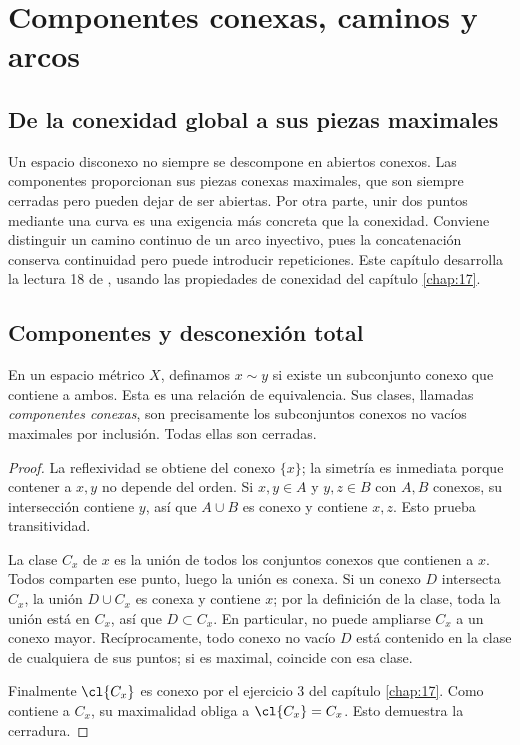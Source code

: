 \chapter{Componentes conexas, caminos y arcos}\label{chap:18}

\section{De la conexidad global a sus piezas maximales}
Un espacio disconexo no siempre se descompone en abiertos conexos. Las componentes proporcionan sus piezas conexas maximales, que son siempre cerradas pero pueden dejar de ser abiertas. Por otra parte, unir dos puntos mediante una curva es una exigencia más concreta que la conexidad. Conviene distinguir un camino continuo de un arco inyectivo, pues la concatenación conserva continuidad pero puede introducir repeticiones. Este capítulo desarrolla la lectura 18 de \cite{valencia}, usando las propiedades de conexidad del capítulo \ref{chap:17}.

\section{Componentes y desconexión total}
\begin{proposicion}\label{ch18:componentes}
En un espacio métrico $X$, definamos $x\sim y$ si existe un subconjunto conexo que contiene a ambos. Esta es una relación de equivalencia. Sus clases, llamadas \emph{componentes conexas}, son precisamente los subconjuntos conexos no vacíos maximales por inclusión. Todas ellas son cerradas.
\end{proposicion}
\begin{proof}
La reflexividad se obtiene del conexo $\{x\}$; la simetría es inmediata porque contener a $x,y$ no depende del orden. Si $x,y\in A$ y $y,z\in B$ con $A,B$ conexos, su intersección contiene $y$, así que $A\cup B$ es conexo y contiene $x,z$. Esto prueba transitividad.

La clase $C_x$ de $x$ es la unión de todos los conjuntos conexos que contienen a $x$. Todos comparten ese punto, luego la unión es conexa. Si un conexo $D$ intersecta $C_x$, la unión $D\cup C_x$ es conexa y contiene $x$; por la definición de la clase, toda la unión está en $C_x$, así que $D\subset C_x$. En particular, no puede ampliarse $C_x$ a un conexo mayor. Recíprocamente, todo conexo no vacío $D$ está contenido en la clase de cualquiera de sus puntos; si es maximal, coincide con esa clase.

Finalmente $\cl{C_x}$ es conexo por el ejercicio 3 del capítulo \ref{chap:17}. Como contiene a $C_x$, su maximalidad obliga a $\cl{C_x}=C_x$. Esto demuestra la cerradura.
\end{proof}

